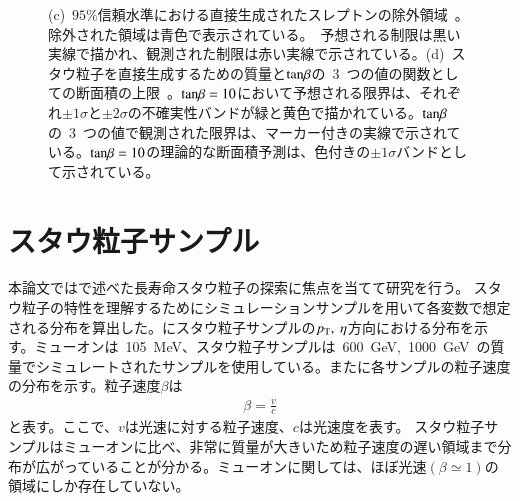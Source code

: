 \begin{figure}[tbp]
{    (c)~$95\%$信頼水準における直接生成されたスレプトンの除外領域~\cite{AR:03}。除外された領域は青色で表示されている。~予想される制限は黒い実線で描かれ、観測された制限は赤い実線で示されている。(d)~スタウ粒子を直接生成するための質量と$\rm{tan}\beta$の~3~つの値の関数としての断面積の上限~\cite{AR:03}。$\rm{tan}\beta=10$において予想される限界は、それぞれ$\pm1\sigma$と$\pm2\sigma$の不確実性バンドが緑と黄色で描かれている。$\rm{tan}\beta$の~3~つの値で観測された限界は、マーカー付きの実線で示されている。$\rm{tan}\beta=10$の理論的な断面積予測は、色付きの$\pm1\sigma$バンドとして示されている。}\label{fig:stau1}
\end{figure}

\section{スタウ粒子サンプル}
本論文ではで述べた長寿命スタウ粒子の探索に焦点を当てて研究を行う。
スタウ粒子の特性を理解するためにシミュレーションサンプルを用いて各変数で想定される分布を算出した。にスタウ粒子サンプルの$p_{\rm{T}},~\eta$方向における分布を示す。ミューオンは~105~MeV、スタウ粒子サンプルは~600~GeV,~1000~GeV~の質量でシミュレートされたサンプルを使用している。またに各サンプルの粒子速度の分布を示す。粒子速度$\beta$は
\begin{align}
    \beta = \frac{v}{c} \label{eq:bb}
\end{align}
と表す。ここで、$v$は光速に対する粒子速度、$c$は光速度を表す。
スタウ粒子サンプルはミューオンに比べ、非常に質量が大きいため粒子速度の遅い領域まで分布が広がっていることが分かる。ミューオンに関しては、ほぼ光速$\left(\beta\simeq1\right)$の領域にしか存在していない。

